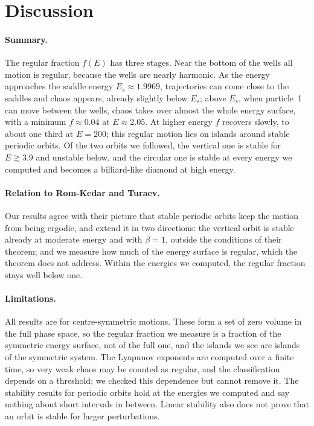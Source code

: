 \documentclass[11pt,a4paper]{article}
\begin{document}
\section{Discussion}\label{sec:discussion}

\paragraph{Summary.}
The regular fraction $f(E)$ has three stages. Near the bottom of the wells all
motion is regular, because the wells are nearly harmonic. As the energy
approaches the saddle energy $E_s\approx1.9969$, trajectories can come close to
the saddles and chaos appears, already slightly below $E_s$; above $E_s$, when
particle~1 can move between the wells, chaos takes over almost the whole
energy surface, with a minimum $f\approx0.04$ at $E\approx2.05$. At higher energy $f$ recovers slowly, to about
one third at $E=200$; this regular motion lies on islands around stable
periodic orbits. Of the two orbits we followed, the vertical one is stable for
$E\gtrsim3.9$ and unstable below, and the circular one is stable at every
energy we computed and becomes a billiard-like diamond at high energy.

\paragraph{Relation to Rom-Kedar and Turaev.}
Our results agree with their picture that stable periodic orbits keep the
motion from being ergodic, and extend it in two directions: the vertical orbit
is stable already at moderate energy and with $\beta=1$, outside the
conditions of their theorem; and we measure how much of the energy surface is
regular, which the theorem does not address. Within the energies we computed,
the regular fraction stays well below one.

\paragraph{Limitations.}
All results are for centre-symmetric motions. These form a set of zero volume
in the full phase space, so the regular fraction we measure is a fraction of
the symmetric energy surface, not of the full one, and the islands we see are
islands of the symmetric system. The Lyapunov exponents are computed over a
finite time, so very weak chaos may be counted as regular, and the
classification depends on a threshold; we checked this dependence but cannot
remove it. The stability results for periodic orbits hold at the energies we
computed and say nothing about short intervals in between. Linear stability
also does not prove that an orbit is stable for larger perturbations.
\end{document}
